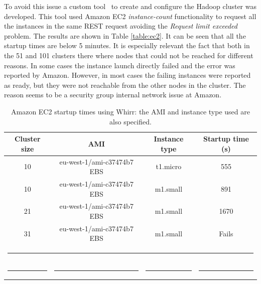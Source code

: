 To avoid this issue a custom tool~\cite{hadoopondemand} to create and configure the Hadoop cluster was developed. This tool used Amazon EC2 \emph{instance-count} functionality to request all the instances in the same REST request avoiding the \emph{Request limit exceeded} problem. The results are shown in Table \ref{table:ec2}. It can be seen that all the startup times are below 5 minutes. It is especially relevant the fact that both in the 51 and 101 clusters there where nodes that could not be reached for different reasons. In some cases the instance launch directly failed and the error was reported by Amazon. However, in most cases the failing instances were reported as ready, but they were not reachable from the other nodes in the cluster. The reason seems to be a security group internal network issue at Amazon.


\begin{table}[h!]
\caption{Amazon EC2 startup times using Whirr: the AMI and instance type used are also specified.}
\label{table:whirr}
%
\vspace{-0.5em}
%
\begin{center}
\begin{tabular}{cccc}
\toprule
Cluster size				& AMI				& Instance type		& Startup time (s) 	  \\
\midrule
10                   			& eu-west-1/ami-c37474b7 EBS	& t1.micro 		& 555   		  \\
10                   			& eu-west-1/ami-c37474b7 EBS	& m1.small		& 891			  \\
21                   			& eu-west-1/ami-c37474b7 EBS	& m1.small 		& 1670			  \\
31                   			& eu-west-1/ami-c37474b7 EBS	& m1.small 		& Fails  		  \\
%
\bottomrule
\multicolumn{4}{c}{\rule{0.98\textwidth}{0em}}\\
\rule{0.2\textwidth}{0cm} & \rule{0.4\textwidth}{0cm} & \rule{0.2\textwidth}{0cm} &  \rule{0.2\textwidth}{0cm} \\
\end{tabular}
\end{center}
\end{table}

